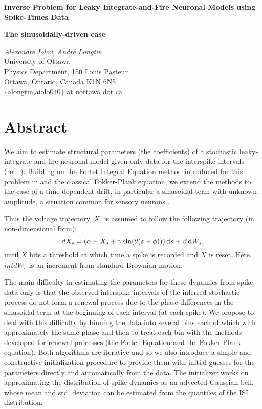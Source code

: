 \documentclass[a4paper,11pt]{article}
\begin{document}
\begin{center}
\textbf{{\Large 
Inverse Problem for Leaky
Integrate-and-Fire Neuronal Models using Spike-Times Data
}}

\medskip

\textbf{{\large The sinusoidally-driven case}}

\bigskip

\textit{Alexandre Iolov},
\textit{Andr\'e Longtin} \\
University of Ottawa  \\
Physics Department, 150 Louis Pasteur \\
Ottawa, Ontario, Canada K1N 6N5  \\
\{alongtin,aiolo040\} at uottawa dot ca \\ 
\end{center}

\section*{Abstract} We aim to estimate structural parameters (the coefficients)
of a stochastic leaky-integrate and fire neuronal model given only data for the
interspike intervals (ref.\ \cite{Meng2011,Mullowney2008a,Ditlevsen2007}).
Building on the Fortet Integral Equation method introduced for this problem in \cite{Ditlevsen2008} and the classical Fokker-Plank
equation, we extend the methods to the case of a time-dependent drift, in
particular a sinusoidal term with unknown amplitude, a situation common for
sensory neurons \cite{Chacron2000}. 

Thus the voltage trajectory, $X$, is assumed to follow the following trajectory
(in non-dimensional form):
\begin{equation}
dX_s = ({\alpha} - X_s + {\gamma } \sin( {\theta} (s+\phi) ) ) \, \mathrm{d} s + {\beta} \, \mathrm{d} W_s .
\label{eq:X_evolution_uo}
\end{equation}
until $X$ hits a threshold at which time a spike is recorded and $X$ is reset.
Here, $intd{W_s}$ is an increment from standard Brownian motion.

The main difficulty in estimating the parameters for these dynamics from
spike-data only is that the observed interspike-intervals of the inferred
stochastic process do not form a renewal process due to the phase differences in
the sinusoidal term at the beginning of each interval (at each spike). We
propose to deal with this difficulty by binning the data into several bins each
of which with approximately the same phase and then to treat each bin with the
methods developed for renewal processes (the Fortet Equation and the
Fokker-Plank equation). Both algorithms are iterative and so we also introduce a
simple and constructive initialization procedure to provide them with initial
guesses for the parameters directly and automatically from the data. The
initializer works on approximating the distribution of spike dynamics as an
advected Gaussian bell, whose mean and std. deviation can be estimated from the
quantiles of the ISI distribution.
\end{document}
